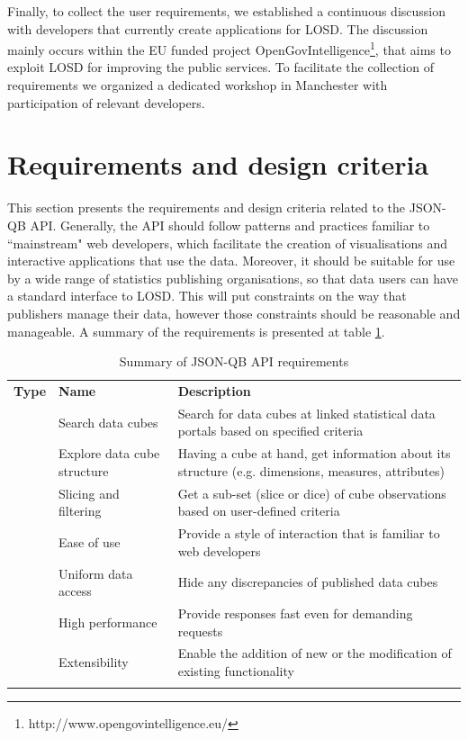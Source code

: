\documentclass{llncs}
\begin{document}
Finally, to collect the user requirements, we established a continuous discussion with developers that currently create applications for LOSD. The discussion mainly occurs within the EU funded project OpenGovIntelligence\footnote{http://www.opengovintelligence.eu/}, that aims to exploit LOSD for improving the public services. To facilitate the collection of requirements we organized a dedicated workshop in Manchester with participation of relevant developers. 


\section{Requirements and design criteria}\label{sec:reqs}

This section presents the requirements and design criteria related to the JSON-QB API. Generally, the API should follow patterns and practices familiar to ``mainstream" web developers, which facilitate the creation of visualisations and interactive applications that use the data. Moreover, it should be suitable for use by a wide range of statistics publishing organisations, so that data users can have a standard interface to LOSD. This will put constraints on the way that publishers manage their data, however those constraints should be reasonable and manageable. A summary of the requirements is presented at table \ref{tbl:req}.

\begin{table}
\caption{Summary of JSON-QB API requirements}
\begin{tabular}{p{2cm}p{4cm}p{5.9cm}}
\hline\noalign{\smallskip}
\textbf{Type} & \textbf{Name} & \textbf{Description}\\
\noalign{\smallskip}
\hline
\noalign{\smallskip}
\multirow{3}{*}{functional} & Search data cubes & Search for data cubes at linked statistical data portals based on specified criteria\\\noalign{\smallskip}
 & Explore data cube structure & Having a cube at hand, get information about its structure (e.g. dimensions, measures, attributes)\\\noalign{\smallskip}
 & Slicing and filtering & Get a sub-set (slice or dice) of cube observations based on user-defined criteria\\\noalign{\smallskip}\hline
\multirow{4}{*}{non-functional} & Ease of use & Provide a style of interaction that is familiar to web developers\\\noalign{\smallskip}
 & Uniform data access & Hide any discrepancies of published data cubes\\\noalign{\smallskip}
 & High performance & Provide responses fast even for demanding requests\\\noalign{\smallskip}
 & Extensibility & Enable the addition of new or the modification of existing functionality\\\noalign{\smallskip}
\hline
\end{tabular}
\label{tbl:req}
\end{table}
\end{document}
